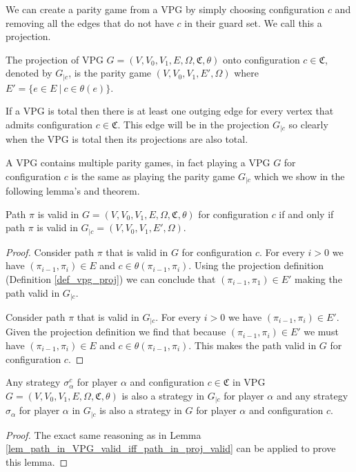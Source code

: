 We can create a parity game from a VPG by simply choosing configuration $c$ and removing all the edges that do not have $c$ in their guard set. We call this a projection.

\begin{definition}
	\label{def_vpg_proj}
	The projection of VPG $G = (V,V_0,V_1,E,\Omega, \mathfrak{C},\theta)$ onto configuration $c\in \mathfrak{C}$, denoted by $G_{|c}$, is the parity game $(V,V_0,V_1,E',\Omega)$ where $E' = \{ e \in E\ |\ c \in \theta(e)\}$.
\end{definition}
If a VPG is total then there is at least one outging edge for every vertex that admits configuration $c \in \mathfrak{C}$. This edge will be in the projection $G_{|c}$ so clearly when the VPG is total then its projections are also total.

A VPG contains multiple parity games, in fact playing a VPG $G$ for configuration $c$ is the same as playing the parity game $G_{|c}$ which we show in the following lemma's and theorem.

\begin{lemma}
	\label{lem_path_in_VPG_valid_iff_path_in_proj_valid}
	Path $\pi$ is valid in $G = (V,V_0,V_1,E,\Omega,\mathfrak{C},\theta)$ for configuration $c$ if and only if path $\pi$ is valid in $G_{|c} = (V,V_0,V_1,E',\Omega)$.
	\begin{proof}
		Consider path $\pi$ that is valid in $G$ for configuration $c$. For every $i>0$ we have $(\pi_{i-1},\pi_i) \in E$ and $c \in \theta(\pi_{i-1},\pi_i)$. Using the projection definition (Definition \ref{def_vpg_proj}) we can conclude that $(\pi_{i-1},\pi_1) \in E'$ making the path valid in $G_{|c}$.
		
		Consider path $\pi$ that is valid in $G_{|c}$. For every $i > 0$ we have $(\pi_{i-1},\pi_i) \in E'$. Given the projection definition we find that because $(\pi_{i-1},\pi_i) \in E'$ we must have $(\pi_{i-1},\pi_i) \in E$ and $c \in \theta(\pi_{i-1},\pi_i)$. This makes the path valid in $G$ for configuration $c$.
	\end{proof}
\end{lemma}

\begin{lemma}
	\label{lem_start_in_VPG_valid_iff_start_in_proj_valid}
	Any strategy $\sigma_\alpha^c$ for player $\alpha$ and configuration $c \in \mathfrak{C}$ in VPG $G = (V,V_0,V_1,E,\Omega,\mathfrak{C},\theta)$ is also a strategy in $G_{|c}$ for player $\alpha$ and any strategy $\sigma_\alpha$ for player $\alpha$ in $G_{|c}$ is also a strategy in $G$ for player $\alpha$ and configuration $c$.
	\begin{proof}
		The exact same reasoning as in Lemma \ref{lem_path_in_VPG_valid_iff_path_in_proj_valid} can be applied to prove this lemma.
	\end{proof}
\end{lemma}

